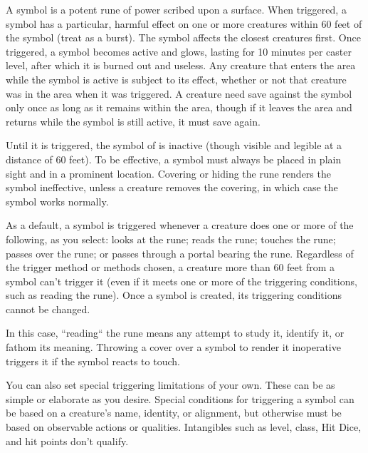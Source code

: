 A symbol is a potent rune of power scribed upon a surface. 
When triggered, a symbol has a particular, harmful effect on one or more creatures within 60 feet of the symbol (treat as a burst).
The symbol affects the closest creatures first.%
Once triggered, a symbol becomes active and glows, 
lasting for 10 minutes per caster level, %
after which it is burned out and useless.
Any creature that enters the area while the symbol is active is subject to its effect, 
whether or not that creature was in the area when it was triggered. 
A creature need save against the symbol only once as long as it remains within the area, 
though if it leaves the area and returns while the symbol is still active, it must save again.

Until it is triggered, the symbol of is inactive (though visible and legible at a distance of 60 feet). 
To be effective, a symbol must always be placed in plain sight and in a prominent location. 
Covering or hiding the rune renders the symbol ineffective, unless a creature removes the covering, in which case the symbol works normally.

As a default, a symbol is triggered whenever a creature does one or more of the following, as you select: 
looks at the rune; reads the rune; touches the rune; passes over the rune; or passes through a portal bearing the rune. 
Regardless of the trigger method or methods chosen, a creature more than 60 feet from a symbol can't trigger it 
(even if it meets one or more of the triggering conditions, such as reading the rune). 
Once a symbol is created, its triggering conditions cannot be changed.

In this case, ``reading`` the rune means any attempt to study it, identify it, or fathom its meaning. 
Throwing a cover over a symbol to render it inoperative triggers it if the symbol reacts to touch. 

You can also set special triggering limitations of your own. 
These can be as simple or elaborate as you desire. 
Special conditions for triggering a symbol can be based on a creature's name, identity, or alignment, 
but otherwise must be based on observable actions or qualities. 
Intangibles such as level, class, Hit Dice, and hit points don't qualify.

